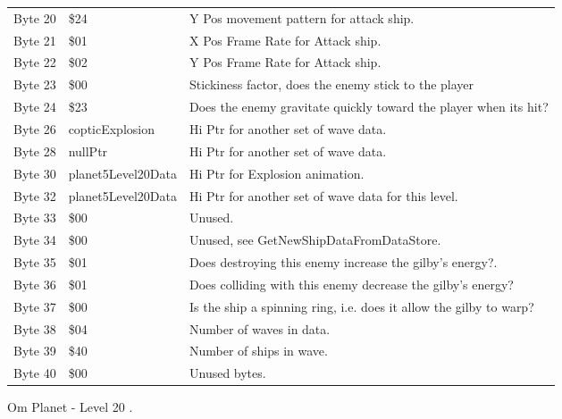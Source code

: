 \begin{figure}[H]
{\begin{adjustbox}{width=12cm}
\begin{tabular}{lll}
 Byte 20 & \$24                & Y Pos movement pattern for attack ship.                            \\
 Byte 21 & \$01                & X Pos Frame Rate for Attack ship.                                  \\
 Byte 22 & \$02                & Y Pos Frame Rate for Attack ship.                                  \\
 Byte 23 & \$00                & Stickiness factor, does the enemy stick to the player              \\
 Byte 24 & \$23                & Does the enemy gravitate quickly toward the player when its hit?   \\
 Byte 26 & copticExplosion    & Hi Ptr for another set of wave data.                               \\
 Byte 28 & nullPtr            & Hi Ptr for another set of wave data.                               \\
 Byte 30 & planet5Level20Data & Hi Ptr for Explosion animation.                                    \\
 Byte 32 & planet5Level20Data & Hi Ptr for another set of wave data for this level.                \\
 Byte 33 & \$00                & Unused.                                                            \\
 Byte 34 & \$00                & Unused, see GetNewShipDataFromDataStore.                           \\
 Byte 35 & \$01                & Does destroying this enemy increase the gilby's energy?.           \\
 Byte 36 & \$01                & Does colliding with this enemy decrease the gilby's energy?        \\
 Byte 37 & \$00                & Is the ship a spinning ring, i.e. does it allow the gilby to warp? \\
 Byte 38 & \$04                & Number of waves in data.                                           \\
 Byte 39 & \$40                & Number of ships in wave.                                           \\
 Byte 40 & \$00                & Unused bytes.                                                      \\
\bottomrule
\end{tabular}

  \end{adjustbox}

  }\caption*{Om Planet - Level 20
.}
\end{figure}
